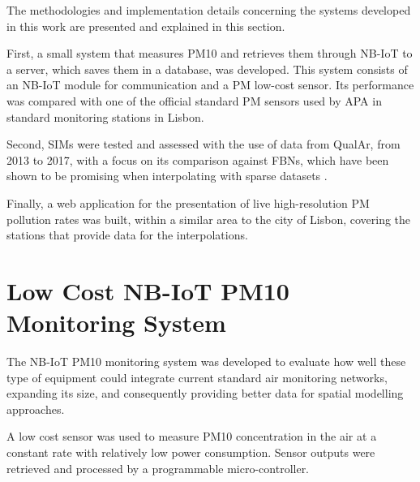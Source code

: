 \cleardoublepage
\label{chap:architecture}


The methodologies and implementation details concerning the systems developed in this work are presented and explained in this section.

First, a small system that measures PM10 and retrieves them through NB-IoT to a server, which saves them in a database, was developed. This system consists of an NB-IoT module for communication and a PM low-cost sensor. Its performance was compared with one of the official standard PM sensors used by \ac{APA} in standard monitoring stations in Lisbon.

Second, SIMs were tested and assessed with the use of data from QualAr, from 2013 to 2017, with a focus on its comparison against FBNs, which have been shown to be promising when interpolating with sparse datasets \cite{Tome2014}.

Finally, a web application for the presentation of live high-resolution PM pollution rates was built, within a similar area to the city of Lisbon, covering the stations that provide data for the interpolations.

\section{Low Cost NB-IoT PM10 Monitoring System} 

The NB-IoT PM10 monitoring system was developed to evaluate how well these type of equipment could integrate current standard air monitoring networks, expanding its size, and consequently providing better data for spatial modelling approaches.

A low cost sensor was used to measure PM10 concentration in the air at a constant rate with relatively low power consumption. Sensor outputs were retrieved and processed by a programmable micro-controller.

